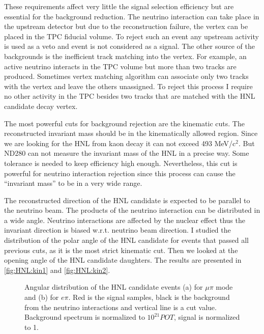 \documentclass[../main.tex]{subfiles}
\begin{document}
These requirements affect very little the signal selection efficiency but are essential for the background reduction. The neutrino interaction can take place in the upstream detector but due to the reconstruction failure, the vertex can be placed in the TPC fiducial volume. To reject such an event any upstream activity is used as a veto and event is not considered as a signal. The other source of the backgrounds is the inefficient track matching into the vertex. For example, an active neutrino interacts in the TPC volume but more than two tracks are produced. Sometimes vertex matching algorithm can associate only two tracks with the vertex and leave the others unassigned. To reject this process I require no other activity in the TPC besides two tracks that are matched with the HNL candidate decay vertex.

The most powerful cuts for background rejection are the kinematic cuts. The reconstructed invariant mass should be in the kinematically allowed region. Since we are looking for the HNL from kaon decay it can not exceed 493 MeV/$\text{c}^2$. But ND280 can not measure the invariant mass of the HNL in a precise way. Some tolerance is needed to keep efficiency high enough. Nevertheless, this cut is powerful for neutrino interaction rejection since this process can cause the ``invariant mass'' to be in a very wide range.

The reconstructed direction of the HNL candidate is expected to be parallel to the neutrino beam. The products of the neutrino interaction can be distributed in a wide angle. Neutrino interactions are affected by the nuclear effect thus the invariant direction is biased w.r.t. neutrino beam direction. I studied the distribution of the polar angle of the HNL candidate for events that passed all previous cuts, as it is the most strict kinematic cut. Then we looked at the opening angle of the HNL candidate daughters. The results are presented in \autoref{fig:HNL:kin1} and \autoref{fig:HNL:kin2}.

\begin{figure}[!ht]
  \begin{minipage}[h]{0.49\linewidth}
  \end{minipage}
  \hfill
  \begin{minipage}[h]{0.49\linewidth}
  \end{minipage}
  \caption{Angular distribution of the HNL candidate events (a) for $\mu\pi$ mode and (b) for $e\pi$. Red is the signal samples, black is the background from the neutrino interactions and vertical line is a cut value. Background spectrum is normalized to $10^{21}POT$, signal is normalized to 1.}
  \label{fig:HNL:kin1}
\end{figure}
\end{document}
